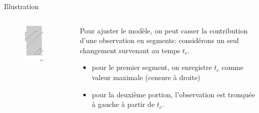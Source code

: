 \documentclass[
  ignorenonframetext,
]{beamer}
\providecommand{\tightlist}{%
  \setlength{\itemsep}{0pt}\setlength{\parskip}{0pt}}\usepackage{longtable,booktabs,array}
\begin{document}
\begin{frame}{Illustration}
\protect\hypertarget{illustration}{}
\begin{columns}[T]
\begin{column}{0.4\textwidth}
\begin{figure}

{\centering \includegraphics[width=0.8\textwidth,height=\textheight]{figures/Lexis_censure_modif.pdf}

}

\end{figure}
\end{column}

\begin{column}{0.6\textwidth}
Pour ajuster le modèle, on peut casser la contribution d'une observation
en segments: considérons un seul changement survenant au temps \(t_c\).

\begin{itemize}
\tightlist
\item
  pour le premier segment, on enregistre \(t_c\) comme valeur maximale
  (censure à droite)
\item
  pour la deuxième portion, l'observation est tronquée à gauche à partir
  de \(t_c\).
\end{itemize}
\end{column}
\end{columns}
\end{frame}
\end{document}
